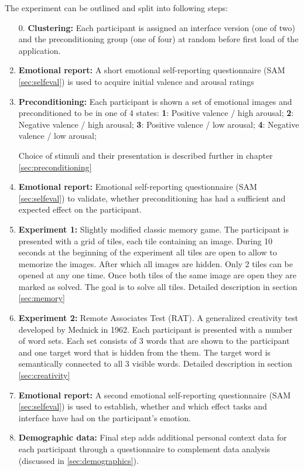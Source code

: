 	The experiment can be outlined and split into following steps:
	
	\begin{enumerate}
		
		\item[0.] \textbf{Clustering:} Each participant is assigned an interface version (one of two) and the preconditioning group (one of four) at random before first load of the application.
		
		\item \textbf{Emotional report:} A short emotional self-reporting questionnaire (SAM \ref{sec:selfeval}) is used to acquire initial valence and arousal ratings
		
		\item \textbf{Preconditioning:} Each participant is shown a set of emotional images and preconditioned to be in one of 4 states:
			\textbf{1}: Positive valence / high arousal;
			\textbf{2}: Negative valence / high arousal;
			\textbf{3}: Positive valence / low arousal;
			\textbf{4}: Negative valence / low arousal;
			
		Choice of stimuli and their presentation is described further in chapter \ref{sec:preconditioning}
			
		\item \textbf{Emotional report:} Emotional self-reporting questionnaire (SAM \ref{sec:selfeval}) to validate, whether preconditioning has had a sufficient and expected effect on the participant.
		
		\item \textbf{Experiment 1:} Slightly modified classic memory game. The participant is presented with a grid of tiles, each tile containing an image. During 10 seconds at the beginning of the experiment all tiles are open to allow to memorize the images. After which all images are hidden. Only 2 tiles can be opened at any one time. Once both tiles of the same image are open they are marked as solved. The goal is to solve all tiles. Detailed description in section \ref{sec:memory}
		
		\item \textbf{Experiment 2:} Remote Associates Test (RAT). A generalized creativity test developed by Mednick \cite{Mednick1962} in 1962. Each participant is presented with a number of word sets. Each set consists of 3 words that are shown to the participant and one target word that is hidden from the them. The target word is semantically connected to all 3 visible words. Detailed description in section \ref{sec:creativity}
		
		\item \textbf{Emotional report:} A second emotional self-reporting questionnaire (SAM \ref{sec:selfeval}) is used to establish, whether and which effect tasks and interface have had on the participant's emotion.
		
		\item \textbf{Demographic data:} Final step adds additional personal context data for each participant through a questionnaire to complement data analysis (discussed in \ref{sec:demographics}).
		
	\end{enumerate}
	
